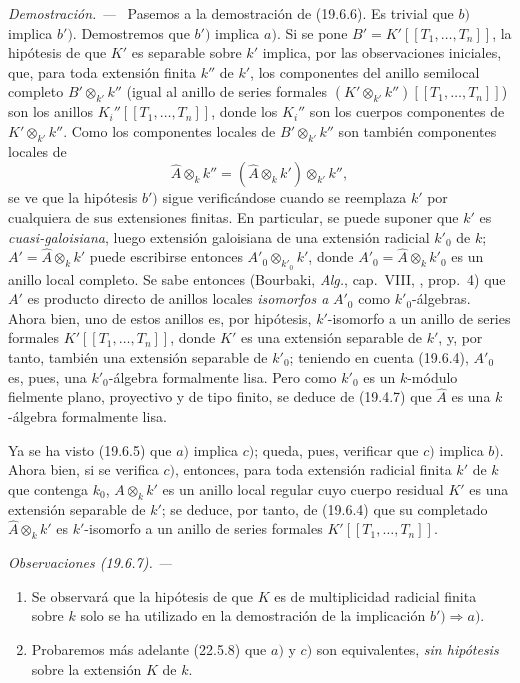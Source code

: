 \documentclass[10pt,oneside]{book}
\makeatletter
\newcommand{\setmanualcurrentlabel}[1]{\def\@currentlabel{#1}}
\newenvironment{remarks}[1][]{%
  \setmanualcurrentlabel{#1}\par\medskip\noindent\itshape Observaciones (#1). ---\ }{\par}
\newenvironment{proof}{%
  \par\medskip\noindent\textit{Demostración. ---\ }}{\par}
\makeatother
\begin{document}
\begin{proof}
Pasemos a la demostración de (19.6.6). Es trivial que $b)$ implica
$b')$. Demostremos que $b')$ implica $a)$. Si se pone
$B'=K'[[T_1,\ldots,T_n]]$, la hipótesis de que $K'$ es separable sobre $k'$
implica, por las observaciones iniciales, que, para toda extensión finita $k''$ de
$k'$, los componentes del anillo semilocal completo $B'\otimes_{k'}k''$
(igual al anillo de series formales
$(K'\otimes_{k'}k'')[[T_1,\ldots,T_n]]$) son los anillos
$K_i''[[T_1,\ldots,T_n]]$, donde los $K_i''$ son los cuerpos componentes de
$K'\otimes_{k'}k''$. Como los componentes locales de $B'\otimes_{k'}k''$ son
también componentes locales de
\[
  \widehat A\otimes_k k''
  =(\widehat A\otimes_k k')\otimes_{k'}k'',
\]
se ve que la hipótesis $b')$ sigue verificándose cuando se reemplaza $k'$ por
cualquiera de sus extensiones finitas. En particular, se puede suponer que
$k'$ es \emph{cuasi-galoisiana}, luego extensión galoisiana de una extensión
radicial $k'_0$ de $k$; $A'=\widehat A\otimes_k k'$ puede escribirse entonces
$A'_0\otimes_{k'_0}k'$, donde $A'_0=\widehat A\otimes_k k'_0$ es un anillo
local completo. Se sabe entonces (Bourbaki, \emph{Alg.}, cap.~VIII,
, prop.~4) que $A'$ es producto directo de anillos locales
\emph{isomorfos a} $A'_0$ como $k'_0$-álgebras. Ahora bien, uno de estos anillos
es, por hipótesis, $k'$-isomorfo a un anillo de series formales
$K'[[T_1,\ldots,T_n]]$, donde $K'$ es una extensión separable de $k'$, y, por
tanto, también una extensión separable de $k'_0$; teniendo en cuenta
(19.6.4), $A'_0$ es, pues, una $k'_0$-álgebra formalmente lisa. Pero como
$k'_0$ es un $k$-módulo fielmente plano, proyectivo y de tipo finito, se deduce
de (19.4.7) que $\widehat A$ es una $k$-álgebra formalmente lisa.

Ya se ha visto (19.6.5) que $a)$ implica $c)$; queda, pues, verificar que
$c)$ implica $b)$. Ahora bien, si se verifica $c)$, entonces, para toda
extensión radicial finita $k'$ de $k$ que contenga $k_0$, $A\otimes_k k'$ es
un anillo local regular cuyo cuerpo residual $K'$ es una extensión separable de
$k'$; se deduce, por tanto, de (19.6.4) que su completado
$\widehat A\otimes_k k'$ es $k'$-isomorfo a un anillo de series formales
$K'[[T_1,\ldots,T_n]]$.
\end{proof}

\begin{remarks}[19.6.7]
\label{0.19.6.7-es}
\begin{enumerate}
  \item[\rm(i)] Se observará que la hipótesis de que $K$ es de multiplicidad
  radicial finita sobre $k$ solo se ha utilizado en la demostración de la
  implicación $b')\Rightarrow a)$.
  \item[\rm(ii)] Probaremos más adelante (22.5.8) que $a)$ y $c)$ son
  equivalentes, \emph{sin hipótesis} sobre la extensión $K$ de $k$.
\end{enumerate}
\end{remarks}
\end{document}
